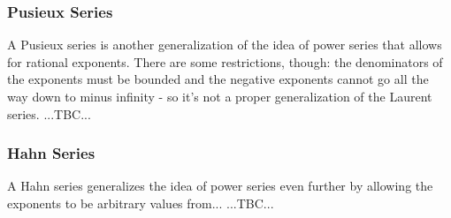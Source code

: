




\subsubsection{Pusieux Series}
A Pusieux series is another generalization of the idea of power series that allows for rational exponents. There are some restrictions, though: the denominators of the exponents must be bounded and the negative exponents cannot go all the way down to minus infinity - so it's not a proper generalization of the Laurent series. ...TBC...



\subsubsection{Hahn Series}
A Hahn series generalizes the idea of power series even further by allowing the exponents to be arbitrary values from... ...TBC...



